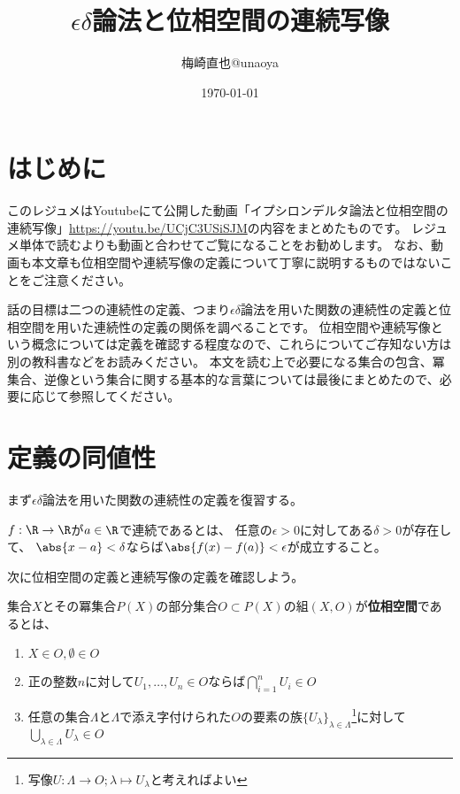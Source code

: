 \documentclass[uplatex]{jsarticle}
\title{$\epsilon\delta$論法と位相空間の連続写像}
\author{梅崎直也@unaoya}
\date{\today}
\begin{document}
\maketitle

\section{はじめに}
このレジュメはYoutubeにて公開した動画「イプシロンデルタ論法と位相空間の連続写像」\url{https://youtu.be/UCjC3USiSJM}の内容をまとめたものです。
レジュメ単体で読むよりも動画と合わせてご覧になることをお勧めします。
なお、動画も本文章も位相空間や連続写像の定義について丁寧に説明するものではないことをご注意ください。

話の目標は二つの連続性の定義、つまり$\epsilon\delta$論法を用いた関数の連続性の定義と位相空間を用いた連続性の定義の関係を調べることです。
位相空間や連続写像という概念については定義を確認する程度なので、これらについてご存知ない方は別の教科書などをお読みください。
本文を読む上で必要になる集合の包含、冪集合、逆像という集合に関する基本的な言葉については最後にまとめたので、必要に応じて参照してください。

\section{定義の同値性}
まず$\epsilon\delta$論法を用いた関数の連続性の定義を復習する。

\begin{dfn}[関数の連続性]\label{point}
  $f:\R \to \R$が$a\in\R$で連続であるとは、
  任意の$\epsilon>0$に対してある$\delta>0$が存在して、
  $\abs{x-a}<\delta$ならば$\abs{f(x)-f(a)}<\epsilon$が成立すること。
\end{dfn}

次に位相空間の定義と連続写像の定義を確認しよう。

\begin{dfn}[位相空間]
  集合$X$とその冪集合$P(X)$の部分集合$O\subset P(X)$の組$(X,O)$が\textbf{位相空間}であるとは、
  \begin{enumerate}
  \item $X\in O, \emptyset\in O$
  \item 正の整数$n$に対して$U_1,\ldots,U_n\in O$ならば$\bigcap_{i=1}^n U_i\in O$
  \item 任意の集合$\Lambda$と$\Lambda$で添え字付けられた$O$の要素の族$\{U_\lambda\}_{\lambda\in\Lambda}$\footnote{写像$U:\Lambda\to O; \lambda\mapsto U_\lambda$と考えればよい}に対して$\bigcup_{\lambda\in\Lambda}U_\lambda\in O$
  \end{enumerate}
\end{dfn}
\end{document}
